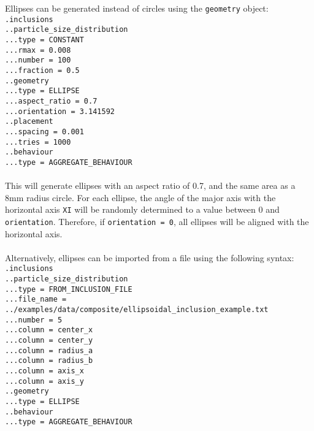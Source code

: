 \documentclass[10pt]{article}
\begin{document}
Ellipses can be generated instead of circles using the \verb+geometry+ object:\\

\noindent \verb+.inclusions+\\
\verb+..particle_size_distribution+\\
\verb+...type = CONSTANT+\\
\verb+...rmax = 0.008+\\
\verb+...number = 100+\\
\verb+...fraction = 0.5+\\
\verb+..geometry+\\
\verb+...type = ELLIPSE+\\
\verb+...aspect_ratio = 0.7+\\
\verb+...orientation = 3.141592+\\
\verb+..placement+\\
\verb+...spacing = 0.001+\\
\verb+...tries = 1000+\\
\verb+..behaviour+\\
\verb+...type = AGGREGATE_BEHAVIOUR+

\paragraph{}This will generate ellipses with an aspect ratio of 0.7, and the same area as a 8mm radius circle. For each ellipse, the angle of the major axis with the horizontal axis \verb+XI+ will be randomly determined to a value between 0 and \verb+orientation+. Therefore, if \verb+orientation = 0+, all ellipses will be aligned with the horizontal axis.

\paragraph{}Alternatively, ellipses can be imported from a file using the following syntax:\\

\noindent \verb+.inclusions+\\
\verb+..particle_size_distribution+\\
\verb+...type = FROM_INCLUSION_FILE+\\
\verb+...file_name = ../examples/data/composite/ellipsoidal_inclusion_example.txt+\\
\verb+...number = 5+\\
\verb+...column = center_x+\\
\verb+...column = center_y+\\
\verb+...column = radius_a+\\
\verb+...column = radius_b+\\
\verb+...column = axis_x+\\
\verb+...column = axis_y+\\
\verb+..geometry+\\
\verb+...type = ELLIPSE+\\
\verb+..behaviour+\\
\verb+...type = AGGREGATE_BEHAVIOUR+
\end{document}
